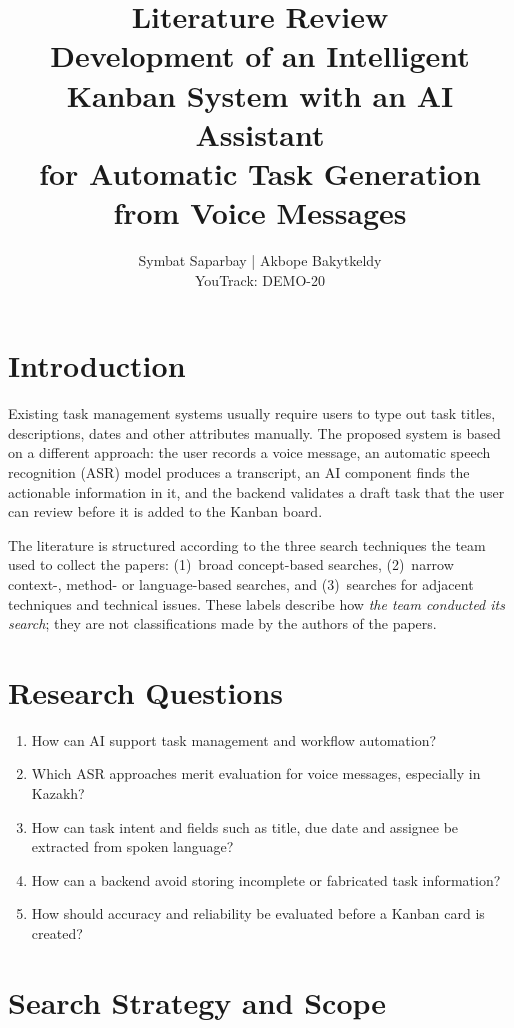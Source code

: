 \documentclass[11pt,a4paper]{article}
\title{\textbf{Literature Review}\\[6pt]
\large Development of an Intelligent Kanban System with an AI Assistant\\
for Automatic Task Generation from Voice Messages}
\author{Symbat Saparbay | Akbope Bakytkeldy\\ \small YouTrack: DEMO-20}
\date{}
\begin{document}
\maketitle

\section{Introduction}

Existing task management systems usually require users to type out task titles, descriptions, dates and other attributes manually. The proposed system is based on a different approach: the user records a voice message, an automatic speech recognition (ASR) model produces a transcript, an AI component finds the actionable information in it, and the backend validates a draft task that the user can review before it is added to the Kanban board.

The literature is structured according to the three search techniques the team used to collect the papers: (1)~broad concept-based searches, (2)~narrow context-, method- or language-based searches, and (3)~searches for adjacent techniques and technical issues. These labels describe how \emph{the team conducted its search}; they are not classifications made by the authors of the papers.

\section{Research Questions}

\begin{enumerate}[label=\textbf{RQ\arabic*.}, leftmargin=*]
  \item How can AI support task management and workflow automation?
  \item Which ASR approaches merit evaluation for voice messages, especially in Kazakh?
  \item How can task intent and fields such as title, due date and assignee be extracted from spoken language?
  \item How can a backend avoid storing incomplete or fabricated task information?
  \item How should accuracy and reliability be evaluated before a Kanban card is created?
\end{enumerate}

\section{Search Strategy and Scope}
\end{document}
